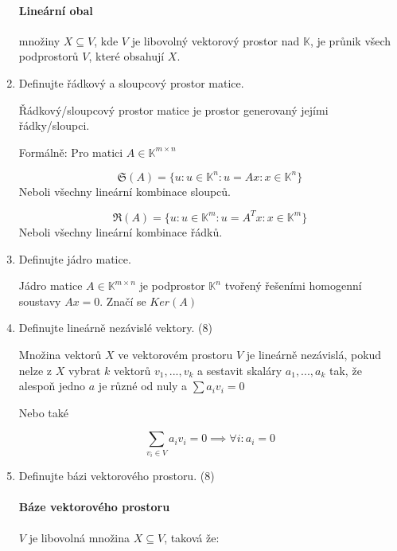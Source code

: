 \documentclass[10pt,a4paper]{article}
\begin{document}
\begin{enumerate}
\paragraph{Lineární obal} množiny $X \subseteq V$, kde $V$ je libovolný vektorový prostor nad $\mathbb{K}$, je průnik všech podprostorů $V$, které obsahují $X$.
 
\item Definujte řádkový a sloupcový prostor matice.

Řádkový/sloupcový prostor matice je prostor generovaný jejími řádky/sloupci.

Formálně:
Pro matici $A \in \mathbb{K}^{m \times n}$

\begin{equation*}
\mathfrak{S}(A) = \{u: u \in \mathbb{K}^n: u = Ax: x \in \mathbb{K}^n\}
\end{equation*}
Neboli všechny lineární kombinace sloupců.

\begin{equation*}
\mathfrak{R}(A) = \{u: u \in \mathbb{K}^m: u = A^Tx: x \in \mathbb{K}^m\}
\end{equation*}
Neboli všechny lineární kombinace řádků.

\item Definujte jádro matice.

Jádro matice  $A \in \mathbb{K}^{m \times n}$ je podprostor  $ \mathbb{K}^n$ tvořený řešeními homogenní soustavy $Ax =0$. Značí se $Ker(A)$

\item Definujte lineárně nezávislé vektory. (8)

Množina vektorů $X$ ve vektorovém prostoru $V$ je lineárně nezávislá, pokud nelze z $X$ vybrat $k$ vektorů $v_1, ..., v_k$ a sestavit skaláry $a_1, ..., a_k$ tak, že alespoň jedno $a$ je různé od nuly a $\displaystyle \sum a_i v_i = 0$

Nebo také

\begin{equation*}
\sum_{v_i \in V} a_i v_i = 0 \implies \forall i: a_i = 0
\end{equation*}

\item Definujte bázi vektorového prostoru. (8)

\paragraph{Báze vektorového prostoru} $V$ je libovolná množina $X \subseteq V$, taková že:


\end{enumerate}
\end{document}
